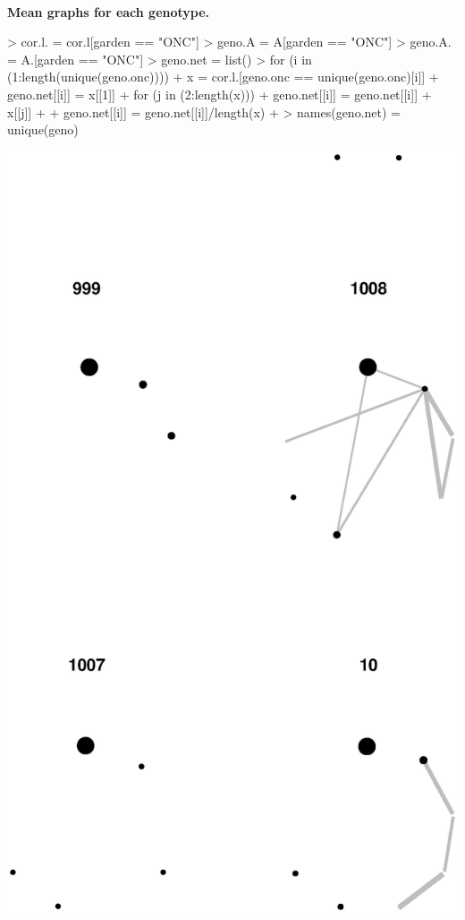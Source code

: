 \documentclass[11pt]{amsart}
\begin{document}
\newpage
\paragraph{}\textbf{Mean graphs for each genotype.}

\begin{Schunk}
\begin{Sinput}
> cor.l. = cor.l[garden == "ONC"]
> geno.A = A[garden == "ONC"]
> geno.A. = A.[garden == "ONC"]
> geno.net = list()
> for (i in (1:length(unique(geno.onc)))) {
+     x = cor.l.[geno.onc == unique(geno.onc)[i]]
+     geno.net[[i]] = x[[1]]
+     for (j in (2:length(x))) {
+         geno.net[[i]] = geno.net[[i]] + x[[j]]
+     }
+     geno.net[[i]] = geno.net[[i]]/length(x)
+ }
> names(geno.net) = unique(geno)
\end{Sinput}
\end{Schunk}

\includegraphics{LCO_analyses-020}
\end{document}
